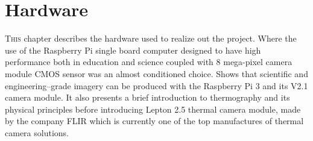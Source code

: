 \chapter{Hardware}
\label{chap:hardware}
\lettrine[lines=3]{T}{his} chapter describes the hardware used to realize out
the project. Where the use of the Raspberry Pi single board computer designed
to have high performance both in education and science coupled with 8
mega-pixel camera module CMOS sensor was an almost conditioned choice. Shows
that scientific and engineering--grade imagery can be produced with the
Raspberry Pi 3 and its V2.1 camera module. It also presents a brief
introduction to thermography and its physical principles before introducing
Lepton 2.5 thermal camera module, made by the company FLIR which is currently
one of the top manufactures of thermal camera solutions.
%



